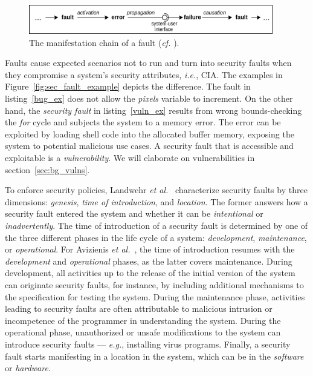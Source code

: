 \begin{figure}[!h]
	\centering
    \includegraphics[width=0.95\textwidth]{figures/chapter_2/fault_pathology.drawio.png}
	\caption{The manifestation chain of a fault (\textit{cf.} \cite{concepts_secure_computing}).}
	\label{fig:fault_chain}
\end{figure}


Faults cause expected scenarios not to run and turn into security faults when they compromise a system's security attributes, \textit{i.e.}, \ac{CIA}. The examples in Figure~\ref{fig:sec_fault_example} depicts the difference. The fault in listing~\ref{bug_ex} does not allow the \textit{pixels} variable to increment. On the other hand, the \textit{security fault} in listing~\ref{vuln_ex} results from wrong bounds-checking the \textit{for} cycle and subjects the system to a memory error. The error can be exploited by loading shell code into the allocated buffer memory, exposing the system to potential malicious use cases. A security fault that is accessible and exploitable is a \textit{vulnerability}. We will elaborate on vulnerabilities in section~\ref{sec:bg_vulns}.
\newline



To enforce security policies, Landwehr \textit{et al.}~\cite{taxonomy_security_flaws} characterize security faults by three dimensions: \textit{genesis}, \textit{time of introduction}, and \textit{location}. The former answers how a security fault entered the system and whether it can be \textit{intentional} or \textit{inadvertently}. The time of introduction of a security fault is determined by one of the three different phases in the life cycle of a system: \textit{development}, \textit{maintenance}, or \textit{operational}. For Avizienis \textit{et al.}~\cite{concepts_secure_computing}, the time of introduction resumes with the \textit{development} and \textit{operational} phases, as the latter covers maintenance. During development, all activities up to the release of the initial version of the system can originate security faults, for instance, by including additional mechanisms to the specification for testing the system. During the maintenance phase, activities leading to security faults are often attributable to malicious intrusion or incompetence of the programmer in understanding the system. During the operational phase, unauthorized or unsafe modifications to the system can introduce security faults — \textit{e.g.}, installing virus programs. Finally, a security fault starts manifesting in a location in the system, which can be in the \textit{software} or \textit{hardware}.

